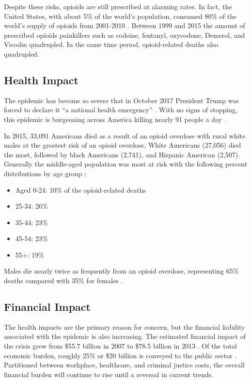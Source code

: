 \documentclass[sigconf]{acmart}
\begin{document}
Despite these risks, opioids are still prescribed at alarming rates. In fact, the United States, with about 5\% of the world's population, consumed 80\% of the world's supply of opioids from 2001-2010 \cite{Vowles01}. Between 1999 and 2015 the amount of prescribed opioids painkillers such as codeine, fentanyl, oxycodone, Demerol, and Vicodin quadrupled. In the same time period, opioid-related deaths also quadrupled.
 
\subsection{Health Impact}
The epidemic has become so severe that in October 2017 President Trump was forced to declare it ``a national health emergency'' \cite{opsis3}.    With no signs of stopping, this epidemic is burgeoning across America killing nearly 91 people a day \cite{opsis10}.
 
In 2015, 33,091 Americans died as a result of an opioid overdose with rural white males at the greatest risk of an opioid overdose.  White Americans (27,056) died the most, followed by black Americans (2,741), and Hispanic American (2,507). Generally the middle-aged population was most at risk with the following percent distributions by age group \cite{opsis4}:
\begin{itemize}
\item Aged 0-24: 10\% of the opioid-related deaths
\item 25-34: 26\% 
\item 35-44: 23\% 
\item 45-54: 23\% 
\item 55+: 19\% 
\end{itemize}
Males die nearly twice as frequently from an opioid overdose, representing 65\% deaths compared with 35\% for females \cite{opsis4}.

\subsection{Financial Impact} 
The health impacts are the primary reason for concern, but the financial liability associated with the epidemic is also increasing. The estimated financial impact of the crisis grew from \$55.7 billion in 2007 \cite{Birnbaum01} to \$78.5 billion in 2013 \cite{Florence01}. Of the total economic burden, roughly 25\% or \$20 billion is conveyed to the public sector \cite{Florence01}. Partitioned between workplace, healthcare, and criminal justice costs, the overall financial burden will continue to rise until a reversal in current trends. 
\end{document}
